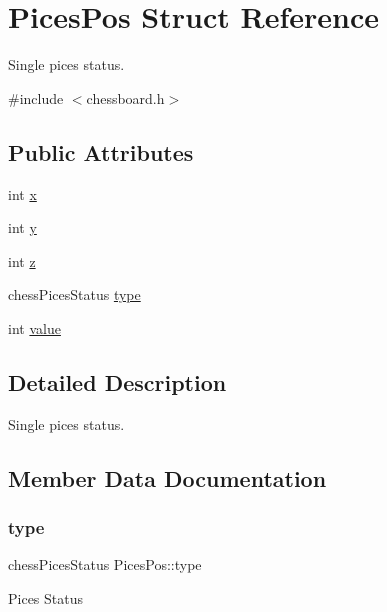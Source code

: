 \hypertarget{struct_pices_pos}{}\section{Pices\+Pos Struct Reference}
\label{struct_pices_pos}


Single pices status.  




{\ttfamily \#include $<$chessboard.\+h$>$}

\subsection*{Public Attributes}
\begin{DoxyCompactItemize}
\item 
int \hyperlink{struct_pices_pos_acb1106796cffe0be268d0520a204656d}{x}
\item 
int \hyperlink{struct_pices_pos_a72146b86f290ee233d93a483d07f1922}{y}
\item 
int \hyperlink{struct_pices_pos_a195acdcf09f1c447e48975aed219f5be}{z}
\item 
chess\+Pices\+Status \hyperlink{struct_pices_pos_a297ffb0e8b5dd50be9fb6cf6af22d9b7}{type}
\item 
int \hyperlink{struct_pices_pos_aafd38b1dbfa288fdafc2e7565238560f}{value}
\end{DoxyCompactItemize}


\subsection{Detailed Description}
Single pices status. 

\subsection{Member Data Documentation}
\mbox{\label{struct_pices_pos_a297ffb0e8b5dd50be9fb6cf6af22d9b7}} 
\subsubsection{\texorpdfstring{type}{type}}
{\footnotesize\ttfamily chess\+Pices\+Status Pices\+Pos\+::type}

Pices Status \mbox{\label{struct_pices_pos_aafd38b1dbfa288fdafc2e7565238560f}} 
